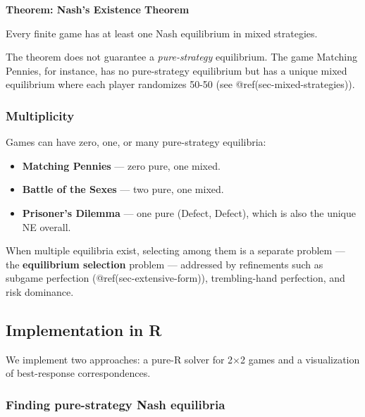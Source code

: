 \documentclass[
]{article}
\providecommand{\tightlist}{%
  \setlength{\itemsep}{0pt}\setlength{\parskip}{0pt}}
\begin{document}
\textbf{Theorem: Nash's Existence Theorem}

Every finite game has at least one Nash equilibrium in mixed strategies.

The theorem does not guarantee a \emph{pure-strategy} equilibrium. The
game Matching Pennies, for instance, has no pure-strategy equilibrium
but has a unique mixed equilibrium where each player randomizes 50-50
(see @ref(sec-mixed-strategies)).

\subsubsection{Multiplicity}\label{multiplicity}

Games can have zero, one, or many pure-strategy equilibria:

\begin{itemize}
\tightlist
\item
  \textbf{Matching Pennies} --- zero pure, one mixed.
\item
  \textbf{Battle of the Sexes} --- two pure, one mixed.
\item
  \textbf{Prisoner's Dilemma} --- one pure (Defect, Defect), which is
  also the unique NE overall.
\end{itemize}

When multiple equilibria exist, selecting among them is a separate
problem --- the \textbf{equilibrium selection} problem --- addressed by
refinements such as subgame perfection (@ref(sec-extensive-form)),
trembling-hand perfection, and risk dominance.

\subsection{Implementation in R}\label{sec-nash-implementation}

We implement two approaches: a pure-R solver for 2×2 games and a
visualization of best-response correspondences.

\subsubsection{Finding pure-strategy Nash
equilibria}\label{finding-pure-strategy-nash-equilibria}
\end{document}
